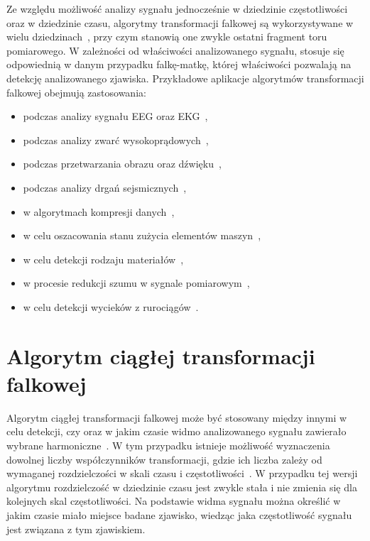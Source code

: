 Ze względu możliwość analizy sygnału jednocześnie w dziedzinie częstotliwości oraz w dziedzinie czasu, algorytmy transformacji falkowej są wykorzystywane w wielu dziedzinach~\cite{akujuobi_applications, ahmad_wavelet, wallen_handbook, singh_mexican, unser_medicine, wei_coiflet}, przy czym stanowią one zwykle ostatni fragment toru pomiarowego. W zależności od właściwości analizowanego sygnału, stosuje się odpowiednią w danym przypadku falkę-matkę, której właściwości pozwalają na detekcję analizowanego zjawiska. Przykładowe aplikacje algorytmów transformacji falkowej obejmują zastosowania:
\begin{itemize}
\item podczas analizy sygnału EEG oraz EKG~\cite{ocak_medicine},
\item podczas analizy zwarć wysokoprądowych~\cite{niedopytalski_zwar, niedopytalski_ene},
\item podczas przetwarzania obrazu oraz dźwięku~\cite{kotteri_imagecomp, averbuch_spline},
\item podczas analizy drgań sejsmicznych~\cite{anping_seismic},
\item w algorytmach kompresji danych~\cite{reddy_compression},
\item w celu oszacowania stanu zużycia elementów maszyn~\cite{yan_mechanics},
\item w celu detekcji rodzaju materiałów~\cite{xie_metals},
\item w procesie redukcji szumu w sygnale pomiarowym~\cite{auth_denoise, vimala_ddendenoise},
\item w celu detekcji wycieków z rurociągów~\cite{siddique_leaks}.
\end{itemize}

\section{Algorytm ciągłej transformacji falkowej}

Algorytm ciągłej transformacji falkowej może być stosowany między innymi w celu detekcji, czy oraz w jakim czasie widmo analizowanego sygnału zawierało wybrane harmoniczne~\cite{anping_seismic}. W tym przypadku istnieje możliwość wyznaczenia dowolnej liczby współczynników transformacji, gdzie ich liczba zależy od wymaganej rozdzielczości w skali czasu i częstotliwości~\cite{wallen_handbook}. W przypadku tej wersji algorytmu rozdzielczość w dziedzinie czasu jest zwykle stała i nie zmienia się dla kolejnych skal częstotliwości. Na podstawie widma sygnału można określić w jakim czasie miało miejsce badane zjawisko, wiedząc jaka częstotliwość sygnału jest związana z tym zjawiskiem.

